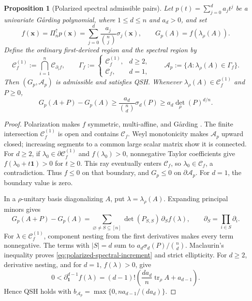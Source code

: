 \documentclass[oneside,english,letterpaper]{amsart}
\numberwithin{equation}{section}
\theoremstyle{plain}
\newtheorem{prop}[thm]{Proposition}
\theoremstyle{definition}
\theoremstyle{remark}
\def\x{\mathbf{x}}
\def\one{\mathbf{1}}
\def\pol{\Pi^\uparrow}
\begin{document}
\begin{prop}[Polarized spectral admissible pairs]
\label{example:polarized-spectral-operators}
\label{thm:spectral-lift-polarization}
Let $p(t)=\sum_{j=0}^d a_jt^j$ be a univariate G{\aa}rding
polynomial, where $1\leq d\leq n$ and $a_d>0$, and set
\[
f(\x)=\pol_n p(\x)=\sum_{j=0}^d\frac{a_j}{\binom nj}\sigma_j(\x),
\qquad G_p(A)=f(\lambda_\rho(A)).
\]
Define the ordinary first-derived region and the spectral region by
\[
\mathcal C_f^{(1)}:=\bigcap_{i=1}^n\mathcal C_{\partial_i f},
\qquad
\Gamma_f:=
\begin{cases}
\mathcal C_f^{(1)},&d\geq2,\\
\mathcal C_f,&d=1,
\end{cases}
\qquad
\mathcal A_p:=\{A:\lambda_\rho(A)\in\Gamma_f\}.
\]
Then $(G_p,\mathcal A_p)$ is admissible and satisfies QSH. Whenever
$\lambda_\rho(A)\in\mathcal C_f^{(1)}$ and $P\geq0$,
\begin{equation}\label{eq:polarized-spectral-increment}
G_p(A+P)-G_p(A)
\geq\frac{a_d}{\binom nd}\sigma_d(P)
\geq a_d\det_\rho(P)^{d/n}.
\end{equation}
\end{prop}
\begin{proof}
Polarization makes $f$ symmetric, multi-affine, and G{\aa}rding
\cite{fang2026idealgaardingpolynomials}. The finite intersection
$\mathcal C_f^{(1)}$ is open and contains $\mathcal C_f$.
Weyl monotonicity makes $\mathcal A_p$ upward closed; increasing
segments to a common large scalar matrix show it is connected.
For $d\geq2$, if $\lambda_0\in\partial\mathcal C_f^{(1)}$ and
$f(\lambda_0)>0$, nonnegative Taylor coefficients give
$f(\lambda_0+t\one)>0$ for $t\geq0$. This ray eventually enters
$\mathcal C_f$, so $\lambda_0\in\mathcal C_f$, a contradiction.
Thus $f\leq0$ on that boundary, and $G_p\leq0$ on
$\partial\mathcal A_p$. For $d=1$, the boundary value is zero.

In a $\rho$-unitary basis diagonalizing $A$, put
$\lambda=\lambda_\rho(A)$. Expanding principal minors gives
\begin{equation}\label{eq:spectral-principal-minor-expansion}
G_p(A+P)-G_p(A)
=\sum_{\varnothing\ne S\subseteq[n]}
\det(P_{S,S})\,\partial_Sf(\lambda),
\qquad \partial_S=\prod_{i\in S}\partial_i.
\end{equation}
For $\lambda\in\mathcal C_f^{(1)}$, component nesting from the
first derivatives makes every term nonnegative. The terms with
$|S|=d$ sum to $a_d\sigma_d(P)/\binom nd$. Maclaurin's inequality
proves \eqref{eq:polarized-spectral-increment} and strict ellipticity.
For $d\geq2$, derivative nesting, and for $d=1$, $f(\lambda)>0$, give
\[
0<\partial_{\one}^{d-1}f(\lambda)
=(d-1)!\left(\frac{da_d}{n}\operatorname{tr}_\rho A+a_{d-1}\right).
\]
Hence QSH holds with $b_{\mathcal A_p}=\max\{0,na_{d-1}/(da_d)\}$.

\end{proof}
\end{document}

